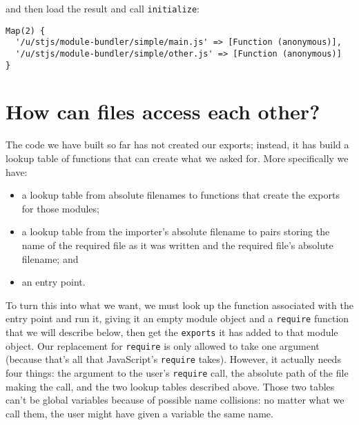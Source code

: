 \documentclass[krantzl]{krantz}
\begin{document}
\noindent and then load the result and call \texttt{initialize}:


\begin{lstlisting}[frame=tblr,backgroundcolor=\color{black!5}]
Map(2) {
  '/u/stjs/module-bundler/simple/main.js' => [Function (anonymous)],
  '/u/stjs/module-bundler/simple/other.js' => [Function (anonymous)]
}
\end{lstlisting}


\section{How can files access each other?}\label{module-bundler-access}


The code we have built so far has not created our exports;
instead,
it has build a lookup table of functions that can create what we asked for.
More specifically we have:

\begin{itemize}

\item 

a lookup table from absolute filenames
    to functions that create the exports for those modules;



\item 

a lookup table from the importer’s absolute filename
    to pairs storing the name of the required file as it was written
    and the required file’s absolute filename;
    and



\item 

an entry point.



\end{itemize}


\noindent To turn this into what we want,
we must look up the function associated with the entry point and run it,
giving it an empty module object and a \texttt{require} function that we will describe below,
then get the \texttt{exports} it has added to that module object.
Our replacement for \texttt{require} is only allowed to take one argument
(because that’s all that JavaScript’s \texttt{require} takes).
However,
it actually needs four things:
the argument to the user’s \texttt{require} call,
the absolute path of the file making the call,
and the two lookup tables described above.
Those two tables can’t be global variables because of possible name collisions:
no matter what we call them,
the user might have given a variable the same name.
\end{document}
